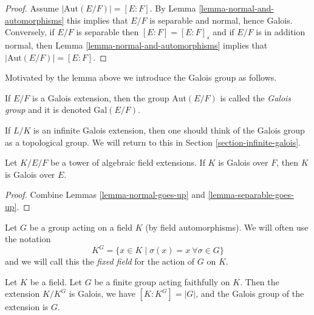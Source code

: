 \begin{proof}
Assume $|\text{Aut}(E/F)| = [E : F]$. By
Lemma \ref{lemma-normal-and-automorphisms} this implies
that $E/F$ is separable and normal, hence Galois.
Conversely, if $E/F$ is separable then $[E : F] = [E : F]_s$ and
if $E/F$ is in addition normal, then
Lemma \ref{lemma-normal-and-automorphisms} implies that
$|\text{Aut}(E/F)| = [E : F]$.
\end{proof}

\noindent
Motivated by the lemma above we introduce the Galois group as follows.

\begin{definition}
\label{definition-galois-group}
If $E/F$ is a Galois extension, then the group $\text{Aut}(E/F)$ is
called the {\it Galois group} and it is denoted $\text{Gal}(E/F)$.
\end{definition}

\noindent
If $L/K$ is an infinite Galois extension, then one should think of the
Galois group as a topological group. We will return to this in
Section \ref{section-infinite-galois}.

\begin{lemma}
\label{lemma-galois-goes-up}
Let $K/E/F$ be a tower of algebraic field extensions.
If $K$ is Galois over $F$, then $K$ is Galois over $E$.
\end{lemma}

\begin{proof}
Combine Lemmas \ref{lemma-normal-goes-up} and \ref{lemma-separable-goes-up}.
\end{proof}

\noindent
Let $G$ be a group acting on a field $K$ (by field automorphisms).
We will often use the notation
$$
K^G = \{x \in K \mid \sigma(x) = x \ \forall \sigma \in G\}
$$
and we will call this the {\it fixed field} for the action of $G$ on $K$.

\begin{lemma}
\label{lemma-galois-over-fixed-field}
Let $K$ be a field. Let $G$ be a finite group acting faithfully on $K$.
Then the extension $K/K^G$ is Galois, we have $[K : K^G] = |G|$,
and the Galois group of the extension is $G$.
\end{lemma}

